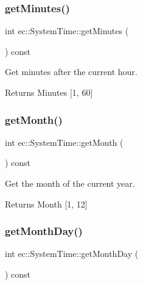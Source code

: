 \subsubsection{\texorpdfstring{get\+Minutes()}{getMinutes()}}
{\footnotesize\ttfamily int ec\+::\+System\+Time\+::get\+Minutes (\begin{DoxyParamCaption}{ }\end{DoxyParamCaption}) const}



Get minutes after the current hour. 

\begin{DoxyReturn}{Returns}
Minutes \mbox{[}1, 60\mbox{]} 
\end{DoxyReturn}
\mbox{\label{classec_1_1_system_time_a9460794471a501cf7a0832bea982a0a2}} 
\subsubsection{\texorpdfstring{get\+Month()}{getMonth()}}
{\footnotesize\ttfamily int ec\+::\+System\+Time\+::get\+Month (\begin{DoxyParamCaption}{ }\end{DoxyParamCaption}) const}



Get the month of the current year. 

\begin{DoxyReturn}{Returns}
Month \mbox{[}1, 12\mbox{]} 
\end{DoxyReturn}
\mbox{\label{classec_1_1_system_time_a4bcf3a5e2d09489469e95c4434dd1332}} 
\subsubsection{\texorpdfstring{get\+Month\+Day()}{getMonthDay()}}
{\footnotesize\ttfamily int ec\+::\+System\+Time\+::get\+Month\+Day (\begin{DoxyParamCaption}{ }\end{DoxyParamCaption}) const}




